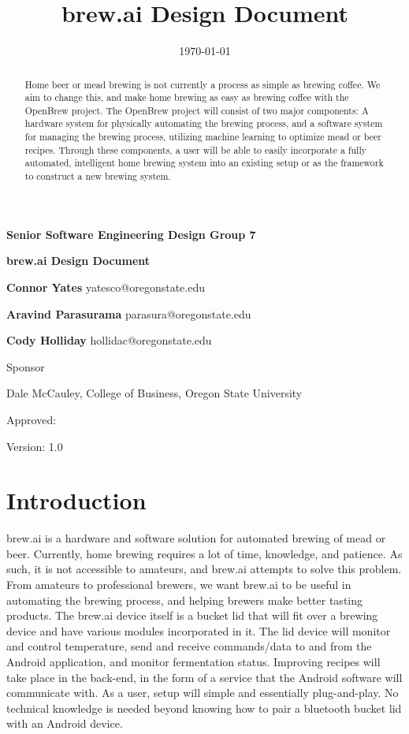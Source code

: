 \documentclass[draftclsnofoot,onecolumn,letterpaper,10pt]{IEEEtran}
\date{\today}
\title{brew.ai Design Document}
\begin{document}
{\huge\textbf{Senior Software Engineering Design Group 7}}
	\vspace{1cm}

{\Huge\textbf{brew.ai Design Document}}

\vspace{2cm}
\textbf{Connor Yates} yatesco@oregonstate.edu

\textbf{Aravind Parasurama} parasura@oregonstate.edu

\textbf{Cody Holliday} hollidac@oregonstate.edu

\vspace{2cm}
Sponsor

Dale McCauley, College of Business, Oregon State University

\vspace{0.5cm}
	Approved: 

	Version: 1.0


\newpage
\begin{abstract}
	Home beer or mead brewing is not currently a process as simple as brewing coffee.
	We aim to change this, and make home brewing as easy as brewing coffee with the OpenBrew project.
	The OpenBrew project will consist of two major components:
	A hardware system for physically automating the brewing process, and a software system for managing the brewing process, utilizing machine learning 
		to optimize mead or beer recipes.
	Through these components, a user will be able to easily incorporate a fully automated, intelligent home brewing system into an existing setup or 
		as the framework to construct a new brewing system.
\end{abstract}
\newpage
\tableofcontents
\newpage
\section{Introduction}
brew.ai is a hardware and software solution for automated brewing of mead or beer. Currently, home brewing requires a lot of time, knowledge, and 
	patience. 
As such, it is not accessible to amateurs, and brew.ai attempts to solve this problem. 
From amateurs to professional brewers, we want brew.ai to be useful in automating the brewing process, and helping brewers make better tasting products. 
The brew.ai device itself is a bucket lid that will fit over a brewing device and have various modules incorporated in it. 
The lid device will monitor and control temperature, send and receive commands/data to and from the Android application, and monitor fermentation status.
Improving recipes will take place in the back-end, in the form of a service that the Android software will communicate with. 
As a user, setup will simple and essentially plug-and-play. 
No technical knowledge is needed beyond knowing how to pair a bluetooth bucket lid with an Android device.
\end{document}
